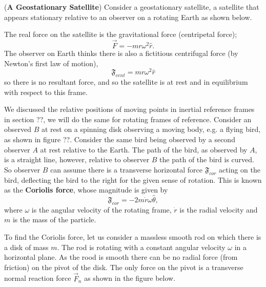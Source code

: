 \begin{example}{(\textbf{A Geostationary Satellite})}
Consider a geostationary satellite, a satellite that appears stationary relative to an observer on a rotating Earth as shown below.

The real force on the satellite is the gravitational force (centripetal force);
\begin{equation*}
    \vec{F} = - mr \omega^2 \hat{r}.
\end{equation*}
The observer on Earth thinks there is also a fictitious centrifugal force (by Newton's first law of motion),
\begin{equation*}
    \mathfrak{F}_{cent} = mr \omega^2 \hat{r}
\end{equation*}
so there is no resultant force, and so the satellite is at rest and in equilibrium with respect to this frame.
\end{example}

We discussed the relative positions of moving points in inertial reference frames in section ??, we will do the same for rotating frames of reference. Consider an observed $B$ at rest on a spinning disk observing a moving body, e.g. a flying bird, as shown in figure ??. Consider the same bird being observed by a second observer $A$ at rest relative to the Earth. The path of the bird, as observed by $A$, is a straight line, however, relative to observer $B$ the path of the bird is curved. So observer $B$ can assume there is a transverse horizontal force $\mathfrak{F}_{cor}$ acting on the bird, deflecting the bird to the right for the given sense of rotation. This is known as the \textbf{Coriolis force}, whose magnitude is given by
\begin{equation}
    \mathfrak{F}_{cor}  = - 2 m \dot{r} \omega \hat{\theta},
\end{equation}
where $\omega$ is the angular velocity of the rotating frame, $\dot{r}$ is the radial velocity and $m$ is the mass of the particle.

To find the Coriolis force, let us consider a massless smooth rod on which there is a disk of mass $m$. The rod is rotating with a constant angular velocity $\omega$ in a horizontal plane. As the rood is smooth there can be no radial force (from friction) on the pivot of the disk. The only force on the pivot is a transverse normal reaction force $\vec{F}_n$ as shown in the figure below. 


